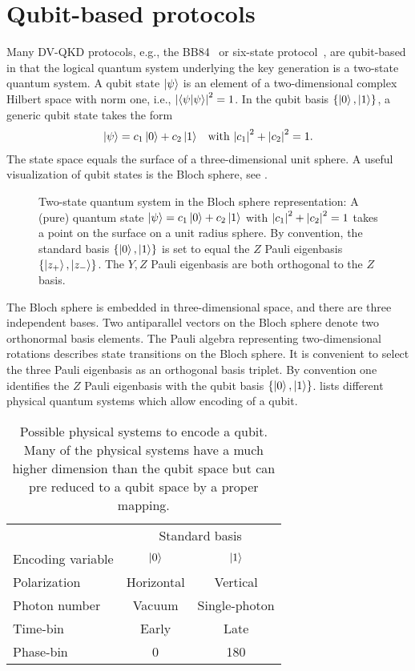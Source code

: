 \section{Qubit-based protocols}

Many DV-QKD protocols, e.g., the BB84~\cite{Bennett1984} or six-state protocol~\cite{Bechmann1999}, are qubit-based in that the logical quantum system underlying the key generation is a two-state quantum system.
A qubit state $\ket{\psi}$ is an element of a two-dimensional complex Hilbert space with norm one, i.e., $\abs{\braket{\psi}}^2=1$.
In the qubit basis $\{\ket{0},\ket{1}\}$, a generic qubit state takes the form
\begin{align}
	\ket{\psi}
	=
	c_1\ket{0}
	+
	c_2\ket{1}
	&&
	\text{with}\
	\abs{c_1}^2
	+
	\abs{c_2}^2
	=
	1
	.
\end{align}
The state space equals the surface of a three-dimensional unit sphere.
A useful visualization of qubit states is the Bloch sphere, see .
\begin{figure}[htb]
	\centering
	
	\caption{Two-state quantum system in the Bloch sphere representation: A (pure) quantum state  $\ket{\psi}=c_1\ket{0}+c_2\ket{1}$ with $\abs{c_1}^2+\abs{c_2}^2=1$ takes a point on the surface on a unit radius sphere. By convention, the standard basis $\left\{\ket{0},\ket{1}\right\}$ is set to equal the $Z$ Pauli eigenbasis $\left\{\ket{z_+},\ket{z_-}\right\}$. The $Y,Z$ Pauli eigenbasis are both orthogonal to the $Z$ basis.}\label{fig:bloch_sphere}
\end{figure}
The Bloch sphere is embedded in three-dimensional space, and there are three independent bases.
Two antiparallel vectors on the Bloch sphere denote two orthonormal basis elements.
The Pauli algebra representing two-dimensional rotations describes state transitions on the Bloch sphere.
It is convenient to select the three Pauli eigenbasis as an orthogonal basis triplet.
By convention one identifies the $Z$ Pauli eigenbasis with the qubit basis $\left\{\ket{0},\ket{1}\right\}$.
\Cref{tab:qubit_encodings} lists different physical quantum systems  which allow encoding of a qubit.
\begin{table}[htb]
	\centering	
	\begin{tabular}{lcc}
		\toprule
		& \multicolumn{2}{c}{Standard basis} \\
		\cmidrule{2-3}
		Encoding variable & $\ket{0}$ & $\ket{1}$ \\
		\midrule
		Polarization & Horizontal & Vertical \\
		Photon number & Vacuum & Single-photon \\
		Time-bin & Early & Late \\
		Phase-bin & \SI{0}{\deg} & \SI{180}{\deg} \\
		\bottomrule
	\end{tabular}
	\caption{Possible physical systems to encode a qubit. Many of the physical systems have a much higher dimension than the qubit space but can pre reduced to a qubit space by a proper mapping.}\label{tab:qubit_encodings}
\end{table}

